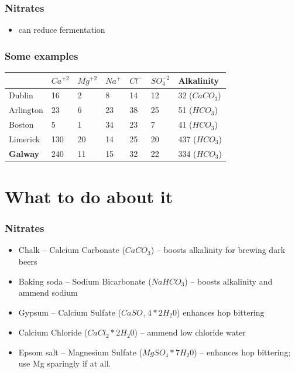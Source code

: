 \documentclass{beamer}
\begin{document}
\begin{frame}\frametitle{Nitrates}
  \begin{itemize}
  \item can reduce fermentation
  \end{itemize}
\end{frame}

\begin{frame}\frametitle{Some examples}
  \begin{table}[]
    \begin{tabular}{l|llllll}
      &          $Ca^{+2}$      & $Mg^{+2}$ & $Na^{+}$ & $Cl^{-}$ & $SO_{4}^{-2}$ & Alkalinity \\
      \hline
      Dublin    & 16   & 2   & 8   & 14    & 12         & 32 ($CaCO_3$) \\
      Arlington & 23   & 6   & 23  & 38    & 25         & 51 ($HCO_3$)  \\
      Boston    & 5    & 1   & 34  & 23    & 7          & 41 ($HCO_3$)  \\
      Limerick  & 130  & 20  & 14  & 25    & 20         & 437 ($HCO_3$) \\
      \textbf{Galway}    & 240  & 11  & 15  & 32    & 22          & 334 ($HCO_3$)
    \end{tabular}
  \end{table}
\end{frame}

\section{What to do about it}
\begin{frame}\frametitle{Nitrates}
  \begin{itemize}
    \item Chalk – Calcium Carbonate ($CaCO_{3}$) -- boosts alkalinity for brewing dark beers

    \item Baking soda – Sodium Bicarbonate ($NaHCO_{3}$) -- boosts alkalinity and ammend sodium

    \item Gypsum – Calcium Sulfate ($CaSO_+4 * 2 H_{2}0$) enhances hop bittering

    \item Calcium Chloride ($CaCl_2 * 2 H_{2}0$) -- ammend  low chloride water

    \item Epsom salt – Magnesium Sulfate ($MgSO_4 * 7 H_{2}0$) -- enhances hop bittering; use Mg sparingly if at all.
  \end{itemize}
\end{frame}
\end{document}
